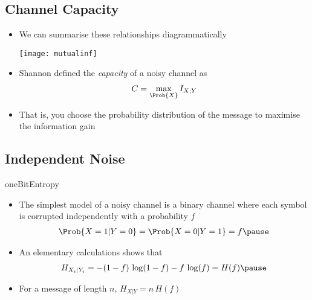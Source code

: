 
\begin{slide}
\section[-1]{Channel Capacity}

\begin{PauseHighLight}
  \begin{itemize}
  \item We can summarise these relationships diagrammatically
    \begin{center}
      \texttt{[image: mutualinf]}\pause
    \end{center}
  \item Shannon defined the \textit{capacity} of a noisy channel as
    \begin{align*}
      C = \max_{\Prob{X}} I_{X;Y}
    \end{align*}
  \item That is, you choose the probability distribution of the
    message to maximise the information gain\pause
  \end{itemize}
\end{PauseHighLight}

\end{slide}


\begin{slide}
\section{Independent Noise}

\begin{rightImage}[0.2]{oneBitEntropy}
\begin{PauseHighLight}
  \begin{itemize}
  \item The simplest model of a noisy channel is a binary channel
    where each symbol is corrupted independently with a probability $f$
    \begin{align*}
      \Prob{X=1|Y=0}=\Prob{X=0|Y=1}=f\pause
    \end{align*}
  \item An elementary calculations shows that
    \begin{align*}
      H_{X_i|Y_i} = - (1-f)\,\log(1-f) - f\,\log(f) = H(f)\pause
    \end{align*}
  \item For a message of length $n$, $H_{X|Y} = n\,H(f)$\pause
  \end{itemize}
\end{PauseHighLight}
\end{rightImage}
  
\end{slide}

